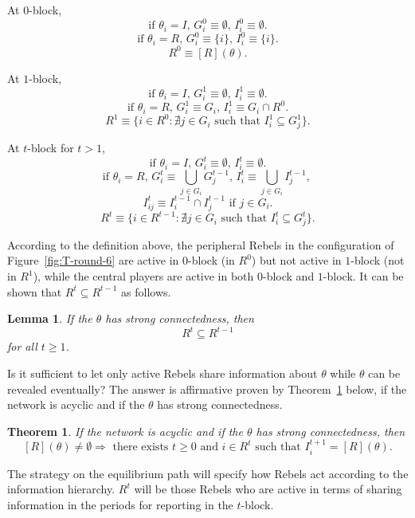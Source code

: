 \documentclass[12pt,letter]{article}
\newtheorem{theorem}{Theorem}
\newtheorem{lemma}{Lemma}[section]
\theoremstyle{definition}
\theoremstyle{remark}
\theoremstyle{claim}
\begin{document}
At $0$-block,
\[\text{if $\theta_i=I$, $G^{0}_i\equiv \emptyset$, $I^{0}_i\equiv \emptyset$.}\] 
\[\text{if $\theta_i=R$, $G^{0}_i\equiv \{i\}$, $I^{0}_i\equiv \{i\}$.}\] 
\[\text{$R^0\equiv [R](\theta)$.}\] 

At $1$-block,
\[\text{if $\theta_i=I$, $G^{1}_i\equiv \emptyset$, $I^{1}_i\equiv \emptyset$.}\] 
\[\text{if $\theta_i=R$, $G^{1}_i\equiv G_i$, $I^{1}_i\equiv G_i\cap R^0$.}\] 
\[\text{$R^1\equiv \{i\in R^0: \nexists j\in G_i \text{ such that }I^1_i\subseteq G^1_j\}$.}\] 

At $t$-block for $t>1$, 
\[\text{if $\theta_i=I$, $G^{t}_i\equiv \emptyset$, $I^{t}_i\equiv \emptyset$.}\] 
\[\text{if $\theta_i=R$, $G^{t}_i\equiv \bigcup_{j\in G_i} G^{t-1}_j$, $I^{t}_i\equiv \bigcup_{j\in G_i} I^{t-1}_j$, }\] 
\[\text{$I^{t}_{ij}\equiv I^{t-1}_i\cap I^{t-1}_j$ if $j\in G_i$.}\]
\[\text{$R^t\equiv \{i\in R^{t-1}: \nexists j\in G_i \text{ such that }I^t_i\subseteq G^t_j\}$.}\]



According to the definition above, the peripheral Rebels in the configuration of Figure~\ref{fig:T-round-6} are active in $0$-block (in $R^0$) but not active in $1$-block (not in $R^1$), while the central players are active in both $0$-block and $1$-block. It can be shown that $R^t\subseteq R^{t-1}$ as follows. 
\begin{lemma}
\label{lemma_inclusion}
If the $\theta$ has strong connectedness, then 
\[R^t\subseteq R^{t-1}\] for all $t\geq 1$.
\end{lemma}

Is it sufficient to let only active Rebels share information about $\theta$ while $\theta$ can be revealed eventually? The answer is affirmative proven by Theorem~\ref{lemma_empty} below, if the network is acyclic and if the $\theta$ has strong connectedness.
\begin{theorem}
\label{lemma_empty}
If the network is acyclic and if the $\theta$ has strong connectedness, then 
\[[R](\theta)\neq \emptyset \Rightarrow \text{ there exists } t\geq 0 \text{ and } i\in R^t \text{ such that }I^{t+1}_i=[R](\theta).\] 
\end{theorem}


The strategy on the equilibrium path will specify how Rebels act according to the information hierarchy. $R^t$ will be those Rebels who are active in terms of sharing information in the periods for reporting in the $t$-block. 

\end{document}
